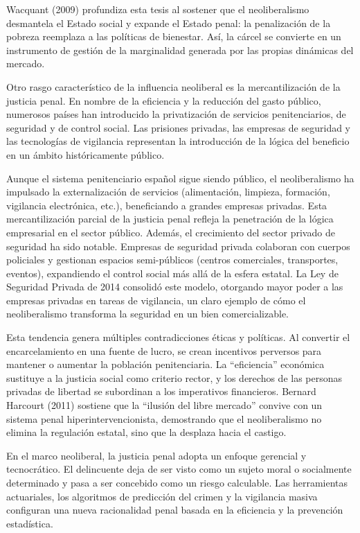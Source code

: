 \documentclass[
  spanish,
  letterpaper,
  DIV=11,
  numbers=noendperiod]{scrreprt}
\begin{document}
Wacquant (2009) profundiza esta tesis al sostener que el neoliberalismo
desmantela el Estado social y expande el Estado penal: la penalización
de la pobreza reemplaza a las políticas de bienestar. Así, la cárcel se
convierte en un instrumento de gestión de la marginalidad generada por
las propias dinámicas del mercado.

Otro rasgo característico de la influencia neoliberal es la
mercantilización de la justicia penal. En nombre de la eficiencia y la
reducción del gasto público, numerosos países han introducido la
privatización de servicios penitenciarios, de seguridad y de control
social. Las prisiones privadas, las empresas de seguridad y las
tecnologías de vigilancia representan la introducción de la lógica del
beneficio en un ámbito históricamente público.

Aunque el sistema penitenciario español sigue siendo público, el
neoliberalismo ha impulsado la externalización de servicios
(alimentación, limpieza, formación, vigilancia electrónica, etc.),
beneficiando a grandes empresas privadas. Esta mercantilización parcial
de la justicia penal refleja la penetración de la lógica empresarial en
el sector público. Además, el crecimiento del sector privado de
seguridad ha sido notable. Empresas de seguridad privada colaboran con
cuerpos policiales y gestionan espacios semi-públicos (centros
comerciales, transportes, eventos), expandiendo el control social más
allá de la esfera estatal. La Ley de Seguridad Privada de 2014 consolidó
este modelo, otorgando mayor poder a las empresas privadas en tareas de
vigilancia, un claro ejemplo de cómo el neoliberalismo transforma la
seguridad en un bien comercializable.

Esta tendencia genera múltiples contradicciones éticas y políticas. Al
convertir el encarcelamiento en una fuente de lucro, se crean incentivos
perversos para mantener o aumentar la población penitenciaria. La
``eficiencia'' económica sustituye a la justicia social como criterio
rector, y los derechos de las personas privadas de libertad se
subordinan a los imperativos financieros. Bernard Harcourt (2011)
sostiene que la ``ilusión del libre mercado'' convive con un sistema
penal hiperintervencionista, demostrando que el neoliberalismo no
elimina la regulación estatal, sino que la desplaza hacia el castigo.

En el marco neoliberal, la justicia penal adopta un enfoque gerencial y
tecnocrático. El delincuente deja de ser visto como un sujeto moral o
socialmente determinado y pasa a ser concebido como un riesgo
calculable. Las herramientas actuariales, los algoritmos de predicción
del crimen y la vigilancia masiva configuran una nueva racionalidad
penal basada en la eficiencia y la prevención estadística.
\end{document}
